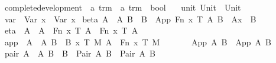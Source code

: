 \begin{implementation}
\isamarkupfalse%
\ complete{\isacharunderscore}development\ {\isacharcolon}{\isacharcolon}\ {\isachardoublequoteopen}{\isacharprime}a\ trm\ {\isasymRightarrow}\ {\isacharprime}a\ trm\ {\isasymRightarrow}\ bool{\isachardoublequoteclose}\ \isanewline
\ \ unit{\isacharcolon}\ {\isachardoublequoteopen}Unit\ {\isachargreater}{\isachargreater}{\isachargreater}\ Unit{\isachardoublequoteclose}\isanewline
{\isacharbar}\ var{\isacharcolon}\ \ {\isachardoublequoteopen}{\isacharparenleft}Var\ x{\isacharparenright}\ {\isachargreater}{\isachargreater}{\isachargreater}\ {\isacharparenleft}Var\ x{\isacharparenright}{\isachardoublequoteclose}\isanewline
{\isacharbar}\ beta{\isacharcolon}\ {\isachardoublequoteopen}{\isasymlbrakk}A\ {\isachargreater}{\isachargreater}{\isachargreater}\ A{\isacharprime}{\isacharsemicolon}\ B\ {\isachargreater}{\isachargreater}{\isachargreater}\ B{\isacharprime}{\isasymrbrakk}\ {\isasymLongrightarrow}\ {\isacharparenleft}App\ {\isacharparenleft}Fn\ x\ T\ A{\isacharparenright}\ B{\isacharparenright}\ {\isachargreater}{\isachargreater}{\isachargreater}\ {\isacharparenleft}A{\isacharprime}{\isacharbrackleft}x\ {\isacharcolon}{\isacharcolon}{\isacharequal}\ B{\isacharprime}{\isacharbrackright}{\isacharparenright}{\isachardoublequoteclose}\isanewline
{\isacharbar}\ eta{\isacharcolon}\ \ {\isachardoublequoteopen}A\ {\isachargreater}{\isachargreater}{\isachargreater}\ A{\isacharprime}\ {\isasymLongrightarrow}\ {\isacharparenleft}Fn\ x\ T\ A{\isacharparenright}\ {\isachargreater}{\isachargreater}{\isachargreater}\ {\isacharparenleft}Fn\ x\ T\ A{\isacharprime}{\isacharparenright}{\isachardoublequoteclose}\isanewline
{\isacharbar}\ app{\isacharcolon}\ \ {\isachardoublequoteopen}{\isasymlbrakk}A\ {\isachargreater}{\isachargreater}{\isachargreater}\ A{\isacharprime}{\isacharsemicolon}\ B\ {\isachargreater}{\isachargreater}{\isachargreater}\ B{\isacharprime}{\isacharsemicolon}\ {\isacharparenleft}{\isasymAnd}x\ T\ M{\isachardot}\ A\ {\isasymnoteq}\ Fn\ x\ T\ M{\isacharparenright}{\isasymrbrakk}\isanewline
\ \ \ \ \ \ {\isasymLongrightarrow}\ {\isacharparenleft}App\ A\ B{\isacharparenright}\ {\isachargreater}{\isachargreater}{\isachargreater}\ {\isacharparenleft}App\ A{\isacharprime}\ B{\isacharprime}{\isacharparenright}{\isachardoublequoteclose}\isanewline
{\isacharbar}\ pair{\isacharcolon}\ {\isachardoublequoteopen}{\isasymlbrakk}A\ {\isachargreater}{\isachargreater}{\isachargreater}\ A{\isacharprime}{\isacharsemicolon}\ B\ {\isachargreater}{\isachargreater}{\isachargreater}\ B{\isacharprime}{\isasymrbrakk}\ {\isasymLongrightarrow}\ {\isacharparenleft}Pair\ A\ B{\isacharparenright}\ {\isachargreater}{\isachargreater}{\isachargreater}\ {\isacharparenleft}Pair\ A{\isacharprime}\ B{\isacharprime}{\isacharparenright}{\isachardoublequoteclose}\isanewline

\end{implementation}
